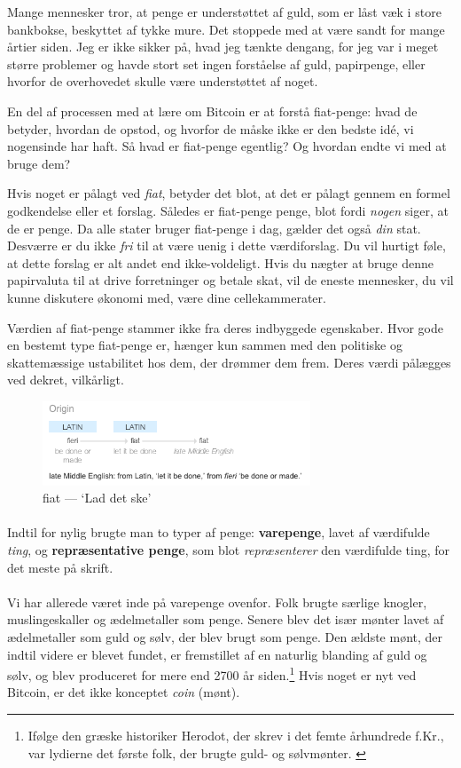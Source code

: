\documentclass[paper=6in:9in,pagesize=pdftex,headinclude=on,footinclude=on,12pt]{scrbook}
\begin{document}
Mange mennesker tror, at penge er understøttet af guld, som er låst væk i store bankbokse, beskyttet af tykke mure. Det stoppede med at være sandt for mange årtier siden. Jeg er ikke sikker på, hvad jeg tænkte dengang, for jeg var i meget større problemer og havde stort set ingen forståelse af guld, papirpenge, eller hvorfor de overhovedet skulle være understøttet af noget.

En del af processen med at lære om Bitcoin er at forstå fiat-penge: hvad de betyder, hvordan de opstod, og hvorfor de måske ikke er den bedste id\'e, vi nogensinde har haft. Så hvad er fiat-penge egentlig? Og hvordan endte vi med at bruge dem?

Hvis noget er pålagt ved \textit{fiat}, betyder det blot, at det er pålagt gennem en formel godkendelse eller et forslag. Således er fiat-penge penge, blot fordi \textit{nogen} siger, at de er penge. Da alle stater bruger fiat-penge i dag, gælder det også \textit{din} stat. Desværre er du ikke \textit{fri} til at være uenig i dette værdiforslag. Du vil hurtigt føle, at dette forslag er alt andet end ikke-voldeligt. Hvis du nægter at bruge denne papirvaluta til at drive forretninger og betale skat, vil de eneste mennesker, du vil kunne diskutere økonomi med, være dine cellekammerater.

Værdien af fiat-penge stammer ikke fra deres indbyggede egenskaber. Hvor gode en bestemt type fiat-penge er, hænger kun sammen med den politiske og skattemæssige ustabilitet hos dem, der drømmer dem frem. Deres værdi pålægges ved dekret, vilkårligt.\begin{figure}
  \centering
  \includegraphics[width=8cm]{assets/images/fiat-definition.png}
  \caption{fiat — `Lad det ske'}
  \label{fig:fiat-definition}
\end{figure}

\paragraph{} Indtil for nylig brugte man to typer af penge: \textbf{varepenge}, lavet af værdifulde \textit{ting}, og \textbf{repræsentative penge}, som blot \textit{repræsenterer} den værdifulde ting, for det meste på skrift.\paragraph{} Vi har allerede været inde på varepenge ovenfor. Folk brugte særlige knogler, muslingeskaller og ædelmetaller som penge. Senere blev det især mønter lavet af ædelmetaller som guld og sølv, der blev brugt som penge. Den ældste mønt, der indtil videre er blevet fundet, er fremstillet af en naturlig blanding af guld og sølv, og blev produceret for mere end 2700 år siden.\footnote{Ifølge den græske historiker Herodot, der skrev i det femte århundrede f.Kr., var lydierne det første folk, der brugte guld- og sølvmønter. \cite{coinage-origins}} Hvis noget er nyt ved Bitcoin, er det ikke konceptet \textit{coin} (mønt).\newpage
\end{document}
